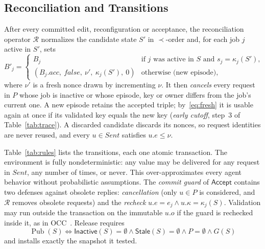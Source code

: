 \documentclass[pdflatex,sn-mathphys-num]{sn-jnl}
\theoremstyle{thmstyleone}%
\theoremstyle{thmstyletwo}%
\theoremstyle{thmstylethree}%
\newcommand{\key}{\kappa}
\newcommand{\Pub}{\operatorname{Pub}}
\newcommand{\Stale}{\mathsf{Stale}}
\newcommand{\Inact}{\mathsf{Inactive}}
\newcommand{\Sent}{\mathit{Sent}}
\newcommand{\Acc}{\mathsf{Accept}}
\begin{document}
\subsection{Reconciliation and Transitions}\label{sec:recon}\label{sec:rules}
After every committed edit, reconfiguration or acceptance, the reconciliation operator $\mathcal R$ normalizes the candidate state $S'$ in $\prec$-order and, for each job $j$ active in $S'$, sets
\begin{equation}\label{eq:recon}
B'_j=\begin{cases}B_j&\text{if }j\text{ was active in }S\text{ and }s_j=\key_j(S'),\\(B_j.\mathit{acc},\ \mathit{false},\ \nu',\ \key_j(S'),\ 0)&\text{otherwise (new episode)},\end{cases}
\end{equation}
where $\nu'$ is a fresh nonce drawn by incrementing $\nu$. It then \emph{cancels} every request in $P$ whose job is inactive or whose episode, key or owner differs from the job's current one. A new episode retains the accepted triple; by~\eqref{eq:fresh} it is usable again at once if its validated key equals the new key (\emph{early cutoff}, step~3 of Table~\ref{tab:trace}). A discarded candidate discards its nonces, so request identities are never reused, and every $u\in\Sent$ satisfies $u.e\le\nu$.

Table~\ref{tab:rules} lists the transitions, each one atomic transaction. The environment is fully nondeterministic: any value may be delivered for any request in $\Sent$, any number of times, or never. This over-approximates every agent behavior without probabilistic assumptions. The \emph{commit guard} of $\Acc$ contains two defenses against obsolete replies: \emph{cancellation} (only $u\in P$ is considered, and $\mathcal R$ removes obsolete requests) and the \emph{recheck} $u.e=e_j\land u.\key=\key_j(S)$. Validation may run outside the transaction on the immutable $u.o$ if the guard is rechecked inside it, as in OCC~\cite{occ}. Release requires
\begin{equation}\label{eq:pub}
\Pub(S)\iff \Inact(S)=\emptyset\land \Stale(S)=\emptyset\land P=\emptyset\land G(S)
\end{equation}
and installs exactly the snapshot it tested.
\end{document}
